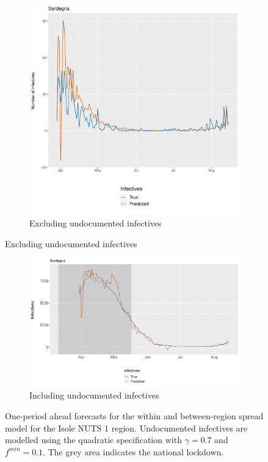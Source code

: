 \documentclass[12pt]{article}
\begin{document}
\begin{appendices}
        \begin{figure}[H]
    	    \centering
    	    \begin{subfigure}{\textwidth}
    	      \centering
    	      \includegraphics[width=0.94\linewidth]{output/model_between_lag14_forecast_start20_Isole_rolling.pdf}
    	      \caption{Excluding undocumented infectives}
    	      \label{fig:forecast_between_isole_regular}
    	    \end{subfigure}
        \end{figure}
        \begin{figure}[H]\ContinuedFloat
    	    \begin{subfigure}{\textwidth}
    	      \centering
    	      \includegraphics[width=0.94\linewidth]{output/model_between_lag14_forecast_start20_Isole_UndocQuadratic_rolling.pdf}
    	      \caption{Including undocumented infectives}
    	      \label{fig:forecast_between_isole_undoc}
    	    \end{subfigure}
    	    \caption{One-period ahead forecasts for the within and between-region spread model for the Isole NUTS 1 region. Undocumented infectives are modelled using the quadratic specification with $\gamma = 0.7$ and $f^{min}=0.1$. The grey area indicates the national lockdown.}
    	    \label{fig:forecast_between_isole}
        \end{figure}
		

\end{appendices}
\end{document}
